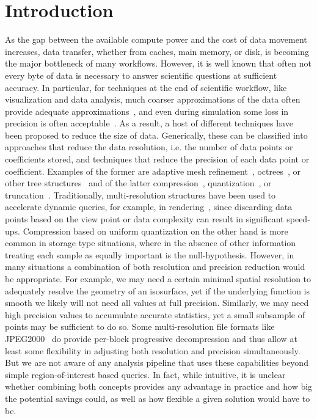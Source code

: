 \section{Introduction}

As the gap between the available compute power and the cost of data
movement increases, data transfer, whether from caches, main memory,
or disk, is becoming the major bottleneck of many workflows. However,
it is well known that often not every byte of data is necessary to
answer scientific questions at sufficient accuracy.
In particular, for techniques at the end of scientific
workflow, like visualization and data analysis, much coarser
approximations of the data often provide adequate approximations~\cite{?},
and even during simulation some loss in precision is often
acceptable~\cite{PetersSCPaper}. As a result, a host of different
techniques have been proposed to reduce the size of data. Generically,
these can be classified into approaches that reduce the data
resolution, i.e. the number of data points or coefficients stored, and
techniques that reduce the precision of each data point or coefficient.
Examples of the former are
adaptive mesh refinement~\cite{AMR}, octrees~\cite{?}, or other tree
structures~\cite{?} and of the latter compression~\cite{?},
quantization~\cite{?}, or truncation~\cite{?}.
Traditionally,
multi-resolution structures have been used to accelerate dynamic
queries, for example, in rendering~\cite{?}, since discarding data points
based on the view point or data complexity can result in significant
speed-ups. Compression based on uniform quantization on the other hand is
more common in storage type situations, where in the absence of other
information treating each sample as equally important is the
null-hypothesis. However, in many situations a combination of both
resolution and precision reduction would be appropriate.
For example, we may need a certain minimal
spatial resolution to adequately resolve the geometry of an isosurface,
yet if the underlying function is smooth we likely will not need all values
at full precision.
Similarly, we may need high precision values to
accumulate accurate statistics, yet a small subsample of points may be
sufficient to do so.
Some multi-resolution file formats like JPEG2000~\cite{?} do
provide per-block progressive decompression and thus allow at least some
flexibility
in adjusting both resolution and precision simultaneously. But we are
not aware of any analysis pipeline that uses these capabilities beyond
simple region-of-interest based queries. In fact, while intuitive, it
is unclear whether combining both concepts provides any
advantage in practice and how big the potential savings could, as well as
how flexible a given solution would have to be.

